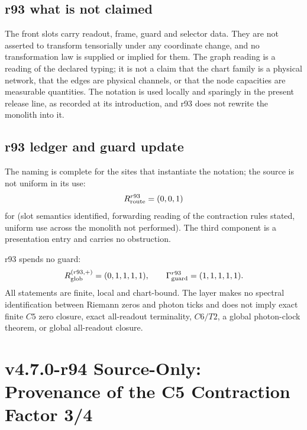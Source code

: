\subsection*{r93 what is not claimed}
\label{subsec:r93-not-claimed}

The front slots carry readout, frame, guard and selector data.  They are not asserted to
transform tensorially under any coordinate change, and no transformation law is supplied or
implied for them.  The graph reading is a reading of the declared typing; it is not a claim
that the chart family is a physical network, that the edges are physical channels, or that
the node capacities are measurable quantities.  The notation is used locally and sparingly in
the present release line, as recorded at its introduction, and r93 does not rewrite the
monolith into it.

\subsection*{r93 ledger and guard update}
\label{subsec:r93-ledger-guard}

The naming is complete for the sites that instantiate the notation; the source is not
uniform in its use:
\[
R_{\rm route}^{r93}=(0,0,1)
\]
for (slot semantics identified, forwarding reading of the contraction rules stated, uniform
use across the monolith not performed).  The third component is a presentation entry and
carries no obstruction.

r93 spends no guard:
\[
R_{\rm glob}^{(r93,+)}=(0,1,1,1,1),
\qquad
\Gamma_{\rm guard}^{r93}=(1,1,1,1,1).
\]
All statements are finite, local and chart-bound.  The layer makes no spectral identification
between Riemann zeros and photon ticks and does not imply exact finite \(C5\) zero closure,
exact all-readout terminality, \(C6/T2\), a global photon-clock theorem, or global
all-readout closure.

\clearpage
\section*{v4.7.0-r94 Source-Only: Provenance of the C5 Contraction Factor 3/4}
\label{sec:r94-c5-factor-provenance}

